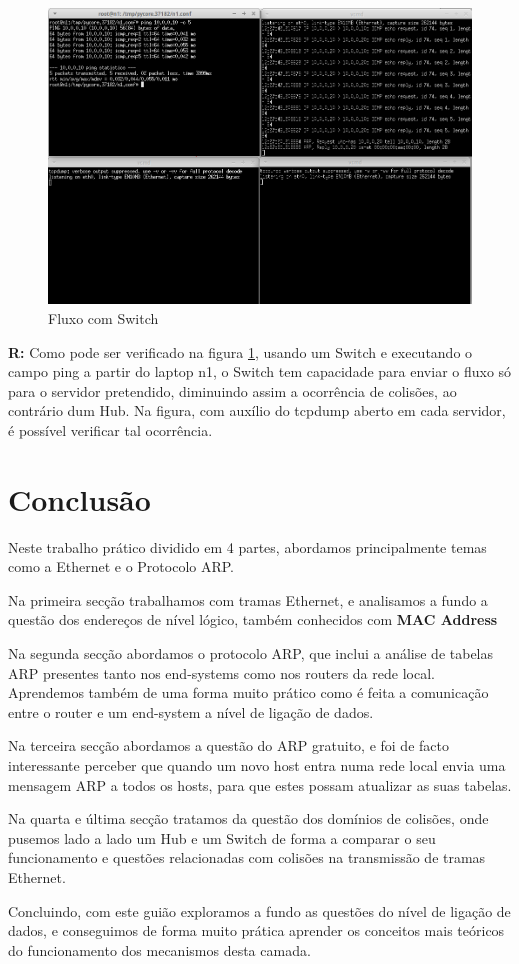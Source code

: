 \documentclass{llncs}
\begin{document}
\begin{figure}[H]
\begin{center}
\includegraphics[scale=0.45]{18_fluxo.png} 
\end{center}
\caption{\label{fig:18_fluxo}Fluxo com Switch}
\end{figure} 
\par
\textbf{R:} Como pode ser verificado na figura \ref{fig:18_fluxo}, usando um Switch e executando o campo ping a partir do laptop n1, o Switch tem capacidade para enviar o fluxo só para o servidor pretendido, diminuindo assim a ocorrência de colisões, ao contrário dum Hub. Na figura, com auxílio do tcpdump aberto em cada servidor, é possível verificar tal ocorrência.


\section{Conclusão}
Neste trabalho prático dividido em 4 partes, abordamos principalmente temas como a Ethernet e o Protocolo ARP.

Na primeira secção trabalhamos com tramas Ethernet, e analisamos a fundo a questão dos endereços de nível lógico, também conhecidos com \textbf{MAC Address}

Na segunda secção abordamos o protocolo ARP, que inclui a análise de tabelas ARP presentes tanto nos end-systems como nos routers da rede local. Aprendemos também de uma forma muito prático como é feita a comunicação entre o router e um end-system a nível de ligação de dados.

Na terceira secção abordamos a questão do ARP gratuito, e foi de facto interessante perceber que quando um novo host entra numa rede local envia uma mensagem ARP a todos os hosts, para que estes possam atualizar as suas tabelas.

Na quarta e última secção tratamos da questão dos domínios de colisões, onde pusemos lado a lado um Hub e um Switch de forma a comparar o seu funcionamento e questões relacionadas com colisões na transmissão de tramas Ethernet.

Concluindo, com este guião exploramos a fundo as questões do nível de ligação de dados, e conseguimos de forma muito prática aprender os conceitos mais teóricos do funcionamento dos mecanismos desta camada.
\end{document}

